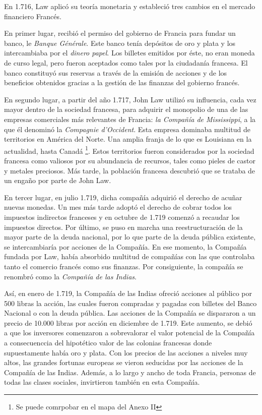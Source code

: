 En 1.716, Law aplicó su teoría monetaria y estableció tres cambios en el mercado financiero Francés. 

En primer lugar, recibió el permiso del gobierno de Francia para fundar un banco, le \emph{Banque Générale}. Este banco tenía depósitos de oro y plata y los intercambiaba por el \emph{dinero papel}. Los billetes emitidos por éste, no eran moneda de curso legal, pero fueron aceptados como tales por la ciudadanía francesa. El banco constituyó sus reservas a través de la emisión de acciones y de los beneficios obtenidos gracias a la gestión de las finanzas del gobierno francés. 

En segundo lugar, a partir del año 1.717, John Law utilizó su influencia, cada vez mayor dentro de la sociedad francesa, para adquirir el monopolio de una de las empresas comerciales más relevantes de Francia: \emph{la Compañía de Mississippi}, a la que él denominó la \emph{Compagnie d'Occident}. Esta empresa dominaba multitud de territorios en América del Norte. Una amplia franja de lo que es Louisiana en la actualidad, hasta Canadá \footnote{Se puede comrpobar en el mapa del Anexo II}. Estos territorios fueron considerados por la sociedad francesa como valiosos por su abundancia de recursos, tales como pieles de castor y metales preciosos. Más tarde, la población francesa descubrió que se trataba de un engaño por parte de John Law. 

En tercer lugar, en julio 1.719, dicha compañía adquirió el derecho de acuñar nuevas monedas. Un mes más tarde adoptó el derecho de cobrar todos los impuestos indirectos franceses y en octubre de 1.719 comenzó a recaudar los impuestos directos. Por último, se puso en marcha una reestructuración de la mayor parte de la deuda nacional, por lo que parte de la deuda pública existente, se intercambiaría por acciones de la Compañía. En ese momento, la Compañía fundada por Law, había absorbido multitud de compañías con las que controlaba tanto el comercio francés como sus finanzas. Por consiguiente, la compañía se renombró como la \emph{Compañía de las Indias}. 

Así, en enero de 1.719, la Compañía de las Indias ofreció acciones al público por 500 libras la acción, las cuales fueron compradas y pagadas con billetes del Banco Nacional o con la deuda pública. Las acciones de la Compañía se dispararon a un precio de 10.000 libras por acción en diciembre de 1.719. Este aumento, se debió a que los inversores comenzaron a sobrevalorar el valor potencial de la Compañía a consecuenccia del hipotético valor de las colonias francesas donde supuestamente había oro y plata. Con los precios de las acciones a niveles muy altos, las grandes fortunas europeas se vieron seducidas por las acciones de la Compañía de las Indias. Además, a lo largo y ancho de toda Francia, personas de todas las clases sociales, invirtieron también en esta Compañía. 

